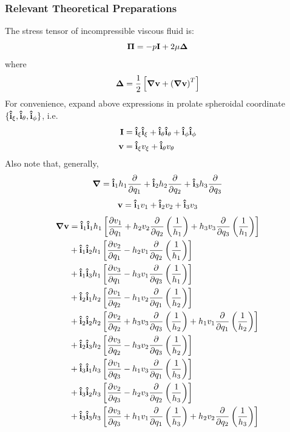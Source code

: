 \documentclass[fontsize=11pt, %
                             paper=a4, %
                             twoside, %
                             captions=tableheading,
                             index=totoc,
                             hyperref]{labbook}
\begin{document}
\subsubsection{Relevant Theoretical Preparations}
The stress tensor of incompressible viscous fluid is:
\begin{equation}
\mbox{\boldmath$ \Pi $} = -p\mathbf{I} + 2\mu \mbox{\boldmath$ \Delta $}
\end{equation}
where
\begin{equation}
\mbox{\boldmath$ \Delta $} = \frac{1}{2}\left[\mbox{\boldmath$ \nabla $} \mathbf{v}+ \left(\mbox{\boldmath$ \nabla $} \mathbf{v}\right)^T\right]
\end{equation}
For convenience, expand above expressions in prolate spheroidal coordinate $\{\mathbf{\hat{i}}_\xi,\mathbf{\hat{i}}_\theta, \mathbf{\hat{i}}_\phi\}$, i.e.
\begin{equation}
\begin{aligned}
\mathbf{I}&=\mathbf{\hat{i}}_\xi \mathbf{\hat{i}}_\xi + \mathbf{\hat{i}}_\theta \mathbf{\hat{i}}_\theta + \mathbf{\hat{i}}_\phi \mathbf{\hat{i}}_\phi\\
\mathbf{v}&=\mathbf{\hat{i}}_\xi v_\xi+\mathbf{\hat{i}}_\theta v_\theta
\end{aligned}
\end{equation}
Also note that, generally,
\begin{equation}
\mbox{\boldmath$ \nabla $} =\mathbf{\hat{i}}_1 h_1\frac{\partial }{\partial q_1}+\mathbf{\hat{i}}_2 h_2\frac{\partial }{\partial q_2}+\mathbf{\hat{i}}_3 h_3\frac{\partial }{\partial q_3}
\end{equation}
\begin{equation}
\mathbf{v}=\mathbf{\hat{i}}_1 v_1 +\mathbf{\hat{i}}_2 v_2 + \mathbf{\hat{i}}_3 v_3
\end{equation}
\begin{equation}
\begin{aligned}
\mbox{\boldmath$ \nabla $} \mathbf{v}&=\mathbf{\hat{i}}_1 \mathbf{\hat{i}}_1 h_1\left[\frac{\partial v_1}{\partial q_1}+h_2v_2\frac{\partial }{\partial q_2}\left(\frac{1}{h_1}\right)+h_3v_3\frac{\partial }{\partial q_3}\left(\frac{1}{h_1}\right)\right]\\
&+\mathbf{\hat{i}}_1 \mathbf{\hat{i}}_2 h_1\left[\frac{\partial v_2}{\partial q_1}-h_2v_1\frac{\partial }{\partial q_2}\left(\frac{1}{h_1}\right)\right]\\
&+\mathbf{\hat{i}}_1 \mathbf{\hat{i}}_3 h_1\left[\frac{\partial v_3}{\partial q_1}-h_3v_1\frac{\partial }{\partial q_3}\left(\frac{1}{h_1}\right)\right]\\
&+\mathbf{\hat{i}}_2 \mathbf{\hat{i}}_1 h_2\left[\frac{\partial v_1}{\partial q_2}-h_1v_2\frac{\partial }{\partial q_1}\left(\frac{1}{h_2}\right)\right]\\
&+\mathbf{\hat{i}}_2 \mathbf{\hat{i}}_2 h_2\left[\frac{\partial v_2}{\partial q_2}+h_3v_3\frac{\partial }{\partial q_3}\left(\frac{1}{h_2}\right)+h_1v_1\frac{\partial }{\partial q_1}\left(\frac{1}{h_2}\right)\right]\\
&+\mathbf{\hat{i}}_2 \mathbf{\hat{i}}_3 h_2\left[\frac{\partial v_3}{\partial q_2}-h_3v_2\frac{\partial }{\partial q_3}\left(\frac{1}{h_2}\right)\right]\\
&+\mathbf{\hat{i}}_3 \mathbf{\hat{i}}_1 h_3\left[\frac{\partial v_1}{\partial q_3}-h_1v_3\frac{\partial }{\partial q_1}\left(\frac{1}{h_3}\right)\right]\\
&+\mathbf{\hat{i}}_3 \mathbf{\hat{i}}_2 h_3\left[\frac{\partial v_2}{\partial q_3}-h_2v_3\frac{\partial }{\partial q_2}\left(\frac{1}{h_3}\right)\right]\\
&+\mathbf{\hat{i}}_3 \mathbf{\hat{i}}_3 h_3\left[\frac{\partial v_3}{\partial q_3}+h_1v_1\frac{\partial }{\partial q_1}\left(\frac{1}{h_3}\right)+h_2v_2\frac{\partial }{\partial q_2}\left(\frac{1}{h_3}\right)\right]
\end{aligned}
\end{equation}
\end{document}
